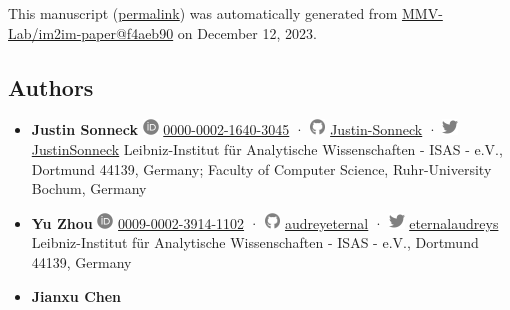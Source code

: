 This manuscript
(\href{https://MMV-Lab.github.io/im2im-paper/v/f4aeb90fb62535045c66cedb190c0d8e1c3373b7/}{permalink})
was automatically generated
from \href{https://github.com/MMV-Lab/im2im-paper/tree/f4aeb90fb62535045c66cedb190c0d8e1c3373b7}{MMV-Lab/im2im-paper@f4aeb90}
on December 12, 2023.

\hypertarget{authors}{%
\subsection{Authors}\label{authors}}

\begin{itemize}
\item
  \textbf{Justin Sonneck}
  \includegraphics[width=0.16667in,height=0.16667in]{images/orcid.svg}
  \href{https://orcid.org/0000-0002-1640-3045}{0000-0002-1640-3045}
  · \includegraphics[width=0.16667in,height=0.16667in]{images/github.svg}
  \href{https://github.com/Justin-Sonneck}{Justin-Sonneck}
  · \includegraphics[width=0.16667in,height=0.16667in]{images/twitter.svg}
  \href{https://twitter.com/JustinSonneck}{JustinSonneck}
  Leibniz-Institut für Analytische Wissenschaften - ISAS - e.V., Dortmund 44139, Germany; Faculty of Computer Science, Ruhr-University Bochum, Germany
\item
  \textbf{Yu Zhou}
  \includegraphics[width=0.16667in,height=0.16667in]{images/orcid.svg}
  \href{https://orcid.org/0009-0002-3914-1102}{0009-0002-3914-1102}
  · \includegraphics[width=0.16667in,height=0.16667in]{images/github.svg}
  \href{https://github.com/audreyeternal}{audreyeternal}
  · \includegraphics[width=0.16667in,height=0.16667in]{images/twitter.svg}
  \href{https://twitter.com/eternalaudreys}{eternalaudreys}
  Leibniz-Institut für Analytische Wissenschaften - ISAS - e.V., Dortmund 44139, Germany
\item
  \textbf{Jianxu Chen}

\end{itemize}
